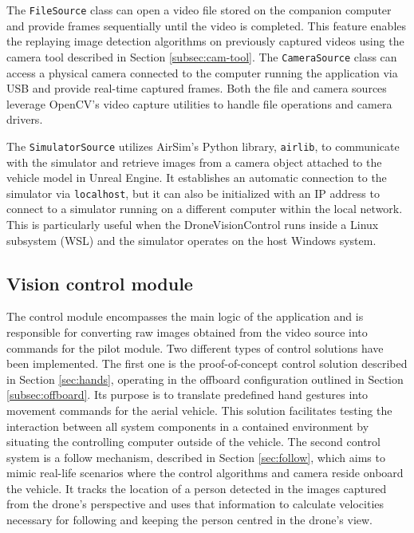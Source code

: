 The \texttt{FileSource} class can open a video file stored on the companion computer and provide frames sequentially until the video is completed. This feature enables the replaying image detection algorithms on previously captured videos using the camera tool described in Section \ref{subsec:cam-tool}. The \texttt{CameraSource} class can access a physical camera connected to the computer running the application via USB and provide real-time captured frames. Both the file and camera sources leverage OpenCV's video capture utilities to handle file operations and camera drivers.

The \texttt{SimulatorSource} utilizes AirSim's Python library, \texttt{airlib}, to communicate with the simulator and retrieve images from a camera object attached to the vehicle model in Unreal Engine. It establishes an automatic connection to the simulator via \texttt{localhost}, but it can also be initialized with an IP address to connect to a simulator running on a different computer within the local network. This is particularly useful when the DroneVisionControl runs inside a Linux subsystem (WSL) and the simulator operates on the host Windows system.

\subsection{Vision control module}
\label{subsec:control-module}

The control module encompasses the main logic of the application and is responsible for converting raw images obtained from the video source into commands for the pilot module. Two different types of control solutions have been implemented. The first one is the proof-of-concept control solution described in Section \ref{sec:hands}, operating in the offboard configuration outlined in Section \ref{subsec:offboard}. Its purpose is to translate predefined hand gestures into movement commands for the aerial vehicle. This solution facilitates testing the interaction between all system components in a contained environment by situating the controlling computer outside of the vehicle. The second control system is a follow mechanism, described in Section \ref{sec:follow}, which aims to mimic real-life scenarios where the control algorithms and camera reside onboard the vehicle. It tracks the location of a person detected in the images captured from the drone's perspective and uses that information to calculate velocities necessary for following and keeping the person centred in the drone's view.

